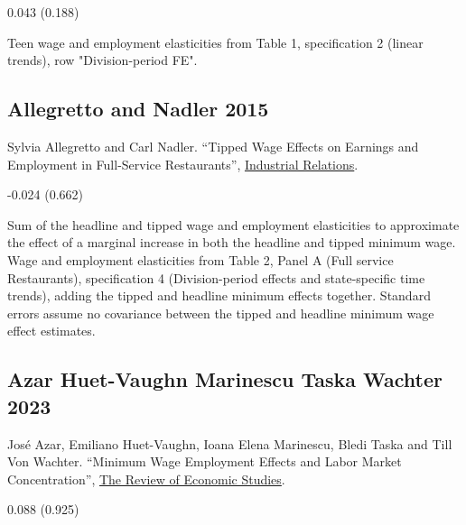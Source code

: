 \vspace{0.7em}

 0.043 (0.188)

\vspace{0.7em}

 Teen wage and employment elasticities from Table 1, specification 2 (linear trends), row "Division-period FE".

\subsection*{Allegretto and Nadler 2015}
\vspace{-0.7em}

\noindent Sylvia Allegretto and Carl Nadler. ``Tipped Wage Effects on Earnings and Employment in Full-Service Restaurants'', \href{https://doi.org/10.1111/irel.12108}{Industrial Relations}.

\vspace{0.7em}

 -0.024 (0.662)

\vspace{0.7em}

 Sum of the headline and tipped wage and employment elasticities to approximate the effect of a marginal increase in both the headline and tipped minimum wage. Wage and employment elasticities from Table 2, Panel A (Full service Restaurants), specification 4 (Division-period effects and state-specific time trends), adding the tipped and headline minimum effects together. Standard errors assume no covariance between the tipped and headline minimum wage effect estimates.

\subsection*{Azar Huet-Vaughn Marinescu Taska Wachter 2023}
\vspace{-0.7em}

\noindent José Azar, Emiliano Huet-Vaughn, Ioana Elena Marinescu, Bledi Taska and Till Von Wachter. ``Minimum Wage Employment Effects and Labor Market Concentration'', \href{https://doi.org/10.1093/restud/rdad091}{The Review of Economic Studies}.

\vspace{0.7em}

 0.088 (0.925)

